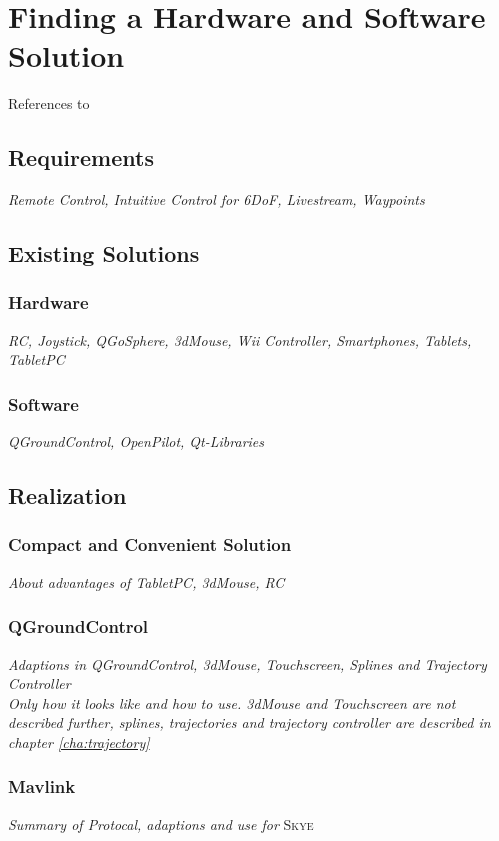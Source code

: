 \chapter{Finding a Hardware and Software Solution}
\label{cha:findHardSoftSolution}
References to \cite{kammermann}
\section{Requirements}
\label{sec:requirements}
\textit{Remote Control, Intuitive Control for 6DoF, Livestream, Waypoints}
\section{Existing Solutions}
\label{sec:existingSolutions}
\subsection{Hardware}
\textit{RC, Joystick, QGoSphere, 3dMouse, Wii Controller, Smartphones, Tablets, TabletPC}
\subsection{Software}
\textit{QGroundControl, OpenPilot, Qt-Libraries}
\section{Realization}
\label{sec:realization}
\subsection{Compact and Convenient Solution}
\textit{About advantages of TabletPC, 3dMouse, RC}
\subsection{QGroundControl}
\textit{Adaptions in QGroundControl, 3dMouse, Touchscreen, Splines and Trajectory Controller \\ Only how it looks like and how to use. 3dMouse and Touchscreen are not described further, splines, trajectories and trajectory controller are described in chapter \ref{cha:trajectory}}
\subsection{Mavlink}
\textit{Summary of Protocal, adaptions and use for} \textsc{Skye}